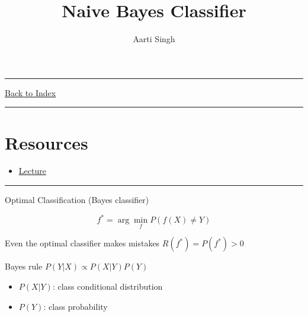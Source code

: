 \documentclass[letterpaper,10pt]{article}
\title{\textbf{Naive Bayes Classifier}}
\author{Aarti Singh}
\newcommand{\panhline}{\begin{center}\rule{\textwidth}{1pt}\end{center}}
\begin{document}
\maketitle

\panhline
\href{../index.html}{Back to Index}

\panhline
\tableofcontents

\section*{Resources}

\begin{itemize}
	\item \href{../../Lectures/06_NaiveBayes.pdf}{Lecture}
\end{itemize}

\panhline

Optimal Classification (Bayes classifier)

$$f^* = \arg\min_f P(f(X)\neq Y)$$ 

Even the optimal classifier makes mistakes $R(f^*)=P(f^*)>0$

Bayes rule $P(Y|X) \propto P(X|Y)P(Y)$
\begin{itemize}
	\item $P(X|Y)$: class conditional distribution
	\item $P(Y)$: class probability
\end{itemize}
\end{document}
